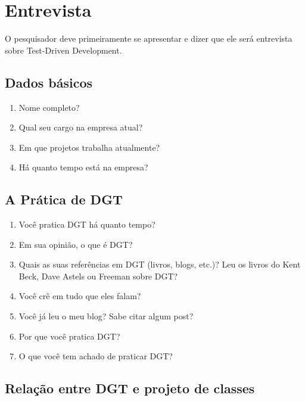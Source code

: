 \chapter{Entrevista}
\label{ape:entrevista}

O pesquisador deve primeiramente se apresentar e dizer que ele será entrevista
sobre Test-Driven Development.

\section{Dados básicos}

\begin{enumerate}
	\item Nome completo?

	\item Qual seu cargo na empresa atual?
	
	\item Em que projetos trabalha atualmente?
	
	\item Há quanto tempo está na empresa?

\end{enumerate}

\section{A Prática de DGT}

\begin{enumerate}
	\item Você pratica DGT há quanto tempo?

	\item Em sua opinião, o que é DGT?
	
	\item Quais as suas referências em DGT (livros, blogs, etc.)? 
		  Leu os livros do Kent Beck, Dave Astels ou Freeman sobre DGT?

	\item Você crê em tudo que eles falam?
	
	\item Você já leu o meu blog? Sabe citar algum post?
	
	\item Por que você pratica DGT?

	\item O que você tem achado de praticar DGT?

\end{enumerate}

\section{Relação entre DGT e projeto de classes}

